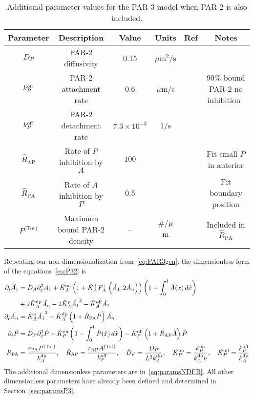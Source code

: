 \documentclass[11pt]{article}
\newcommand{\6}[1]{#1_{\text{6}}}
\newcommand{\3}[1]{#1_{\text{3}}}
\newcommand{\Tot}[1]{#1^\text{(Tot)}}
\newcommand{\A}[1]{#1_A}
\begin{document}
\begin{table}
\begin{small}
\centering
\begin{tabular}{|c|c|c|c|c|c|}\hline
Parameter & Description & Value & Units & Ref & Notes \\ \hline
$D_P$ & PAR-2 diffusivity & 0.15 & $\mu$m$^2$/s & \cite{goehring2011polarization}&  \\ 
$k^\text{on}_P$ & PAR-2 attachment rate & 0.6 & $\mu$m/s & & 90\% bound PAR-2 no inhibition\ \\ 
$k^\text{off}_P$ & PAR-2 detachment rate & $7.3 \times 10^{-3}$ & 1/s & \cite{goehring2011polarization}&  \\  
$\hat{R}_\text{AP}$ & Rate of $P$ inhibition by $A$ & $100$ & & & Fit small $P$ in anterior\\
$\hat{R}_\text{PA}$ & Rate of $A$ inhibition by $P$ & 0.5  &  &  & Fit boundary position\\
$\Tot{P}$ & Maximum bound PAR-2 density & -- & $\#/\mu$m& &  Included in $\hat{R}_\text{PA}$ \\ \hline
\end{tabular}
\caption{\label{tab:paramsP2}Additional parameter values for the PAR-3 model when PAR-2  is also included.}
\end{small}
\end{table}

Repeating our non-dimensionalization from\ \eqref{eq:PAR3gen}, the dimensionless form of the equations\ \eqref{eq:P32} is
\begin{subequations}
\label{eq:PAR2PAR3}
\begin{align}
\nonumber
\Dthat \hat{\MA} & = \DhatA \Dxhat^2 \MA +\KhatonA \left(1+\KhatfA \A{F}^+\left(\hat{\MA},2\hat{\PA}\right)\right)\left(1 - \int_0^1 \hat{A}(x) \, d\hat{x} \right) \\ 
&+ 2\KhatdpA \hat{\PA}-2\KhatpA \hat{\MA}^2 - \KhatoffA \hat{\MA} \\ 
\Dthat \hat{\PA} & =\KhatpA \hat{\MA}^2- \KhatdpA \left(1+\hat{R}_\text{PA}\hat{P}\right) \hat{\PA} \\ 
\Dthat \hat{P} & =\DhatP \Dxhat^2 \hat{P} +\KhatonP \left(1 - \int_0^1 \hat{P}(\hat x) \, d\hat{x} \right)  - \KhatoffP \left(1+\hat{R}_\text{AP}\hat{A}\right)\hat{P} \\ 
\label{eq:paramsNDFB}
\hat{R}_\text{PA}&=\frac{r_\text{PA} \Tot{P}}{\kdp_A},\quad \hat{R}_\text{AP}=\frac{r_\text{AP} \Tot{A}}{\koff_P},\quad \DhatP =\frac{D_P}{L^2 \A{\kdp}}, \quad \KhatonP=\frac{{\kon_P}}{\A{\kdp} h },\quad \KhatoffP = \frac{\koff_P}{\kdp_A}
\end{align}
\end{subequations}
The additional dimensionless parameters are in\ \eqref{eq:paramsNDFB}. All other dimensionless parameters have already been defined and determined in Section\ \ref{sec:paramsP3}.
\end{document}
